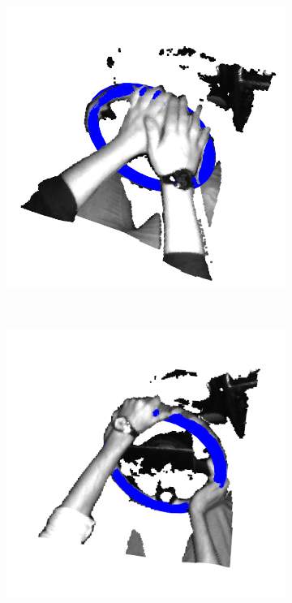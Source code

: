 \begin{figure}[ht]
\begin{subfigure}[t]{0.3\textwidth}
    \end{subfigure}\hfill
    \begin{subfigure}[t]{0.3\textwidth}
        \centering
        \includegraphics[width=\textwidth]{media/chapter 3/torus3.png}
    \end{subfigure}\\
    \begin{subfigure}[t]{0.3\textwidth}
        \centering
        \includegraphics[width=\textwidth]{media/chapter 3/torus4.png}

\end{subfigure}
\end{figure}
